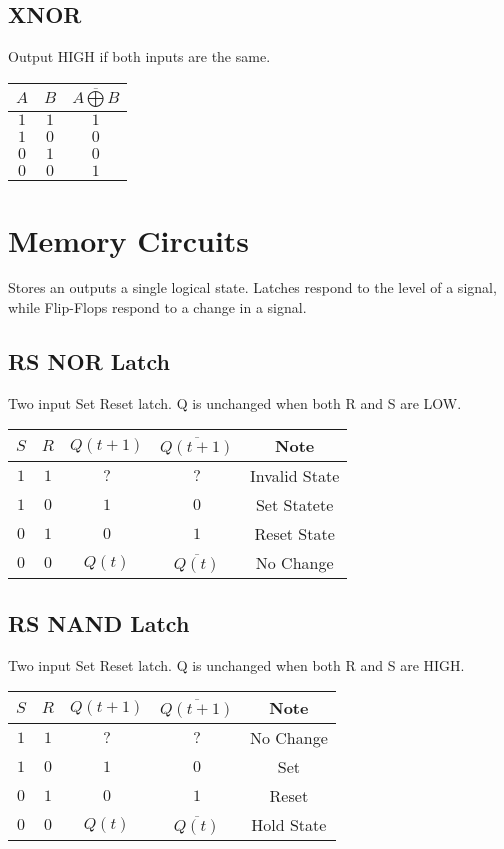 \documentclass[12pt]{article}
\begin{document}
\subsection{XNOR}
Output HIGH if both inputs are the same. \bigskip\\
\begin{tabular}{|c|c|c|}\hline
$A$ & $B$ & $\overline{A \bigoplus B}$ \\\hline
$1$ & $1$ & $1$ \\\hline
$1$ & $0$ & $0$ \\\hline
$0$ & $1$ & $0$ \\\hline
$0$ & $0$ & $1$ \\\hline
\end{tabular}

\pagebreak

\section{Memory Circuits}
Stores an outputs a single logical state.  Latches respond to the level of a signal, while Flip-Flops respond to a change in a signal. 

\subsection{RS NOR Latch}
Two input Set Reset latch. Q is unchanged when both R and S are LOW. \bigskip\\
\begin{tabular}{|c|c|c|c|c|}\hline
$S$ & $R$ & $Q(t+1)$ & $\overline{Q(t+1)}$ & Note\\\hline
$1$ & $1$ & $?$ & $?$ & Invalid State\\\hline
$1$ & $0$ & $1$ & $0$ & Set Statete\\\hline
$0$ & $1$ & $0$ & $1$ & Reset State\\\hline
$0$ & $0$ & $Q(t)$ & $\overline{Q(t)}$ & No Change\\\hline
\end{tabular}

\subsection{RS NAND Latch}
Two input Set Reset latch. Q is unchanged when both R and S are HIGH. \bigskip\\
\begin{tabular}{|c|c|c|c|c|}\hline
$S$ & $R$ & $Q(t+1)$ & $\overline{Q(t+1)}$ & Note\\\hline
$1$ & $1$ & $?$ & $?$ & No Change\\\hline
$1$ & $0$ & $1$ & $0$ & Set\\\hline
$0$ & $1$ & $0$ & $1$ & Reset\\\hline
$0$ & $0$ & $Q(t)$ & $\overline{Q(t)}$ & Hold State\\\hline
\end{tabular}
\end{document}
